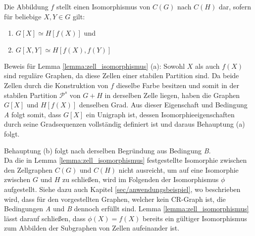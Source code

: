 \begin{Lemma}
	Die Abbildung $f$ stellt einen Isomorphismus von $C(G)$ nach $C(H)$ dar, sofern für beliebige $X,Y\in G$ gilt:
	\begin{enumerate}[label=(\alph*)]
		\item $G[X]\simeq H[f(X)]$ und
		\item $G[X,Y]\simeq H[f(X),f(Y)]$
	\end{enumerate}
	\label{lemma:zell_isomorphismus}
\end{Lemma}

Beweis für Lemma \ref{lemma:zell_isomorphismus} (a):
Sowohl $X$ als auch $f(X)$ sind reguläre Graphen, da diese Zellen einer stabilen Partition sind.
Da beide Zellen durch die Konstruktion von $f$ dieselbe Farbe besitzen und somit in der stabilen Partition $\mathcal{P}^s$ von $G+H$ in derselben Zelle liegen, haben die Graphen $G[X]$ und $H[f(X)]$ denselben Grad.
Aus dieser Eigenschaft und Bedingung \emph{A} folgt somit, dass $G[X]$ ein Unigraph ist, dessen Isomorphieeigenschaften durch seine Gradsequenzen vollständig definiert ist und daraus Behauptung (a) folgt.

Behauptung (b) folgt nach derselben Begründung aus Bedingung \emph{B}.\\

Da die in Lemma \ref{lemma:zell_isomorphismus} festgestellte Isomorphie zwischen den Zellgraphen $C(G)$ und $C(H)$ nicht ausreicht, um auf eine Isomorphie zwischen $G$ und $H$ zu schließen, wird im Folgenden der Isomorphismus $\phi $ aufgestellt.
Siehe dazu auch Kapitel \ref{sec/anwendungsbeispiel}, wo beschrieben wird, dass für den vorgestellten Graphen, welcher kein CR-Graph ist, die Bedingungen \emph{A} und \emph{B} dennoch erfüllt sind.
Lemma \ref{lemma:zell_isomorphismus} lässt darauf schließen, dass $\phi (X)=f(X)$ bereits ein gültiger Isomorphismus zum Abbilden der Subgraphen von Zellen aufeinander ist.


